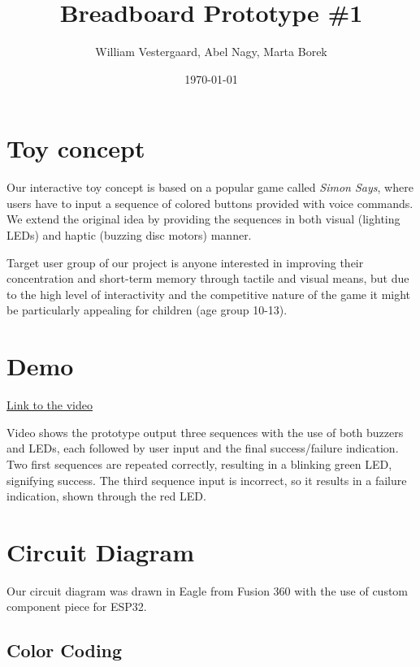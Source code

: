 \documentclass[a4paper]{article}
\title{Breadboard Prototype \#1}
\author{William Vestergaard, Abel Nagy, Marta Borek}
\date{\today}
\begin{document}
\maketitle	
\section{Toy concept}

\noindent Our interactive toy concept is based on a popular game called \textit{Simon Says}, where users have to input a sequence of colored buttons provided with voice commands. We extend the original idea by providing the sequences in both visual (lighting LEDs) and haptic (buzzing disc motors) manner.


\noindent Target user group of our project is anyone interested in improving their concentration and short-term memory through tactile and visual means, but due to the high level of interactivity and the competitive nature of the game it might be particularly appealing for children (age group 10-13).

\section{Demo}
\href{https://aarhusuniversitet-my.sharepoint.com/:v:/g/personal/au802349_uni_au_dk/EYu93GnpKyVOjn9N1xiUcd0BokxDAjE5eCbD5Ibb2XIgbQ?nav=eyJyZWZlcnJhbEluZm8iOnsicmVmZXJyYWxBcHAiOiJPbmVEcml2ZUZvckJ1c2luZXNzIiwicmVmZXJyYWxBcHBQbGF0Zm9ybSI6IldlYiIsInJlZmVycmFsTW9kZSI6InZpZXciLCJyZWZlcnJhbFZpZXciOiJNeUZpbGVzTGlua0NvcHkifX0&e=tQ1Llt}{Link to the video}

\noindent Video shows the prototype output three sequences with the use of both buzzers and LEDs, each followed by user input and the final success/failure indication. Two first sequences are repeated correctly, resulting in a blinking green LED, signifying success. The third sequence input is incorrect, so it results in a failure indication, shown through the red LED.

\section{Circuit Diagram}
Our circuit diagram was drawn in Eagle from Fusion 360 with the use of custom component piece for ESP32.



\subsection{Color Coding}
\end{document}
